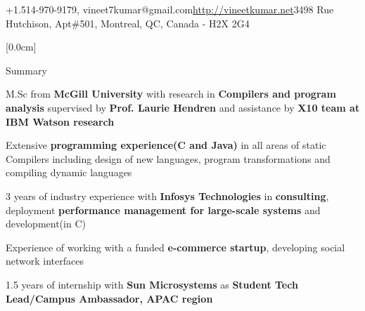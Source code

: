 \documentclass{resume} %
\begin{document}
\begin{hSubsection}{+1.514-970-9179, vineet7kumar@gmail.com}{\url{http://vineetkumar.net}}{3498 Rue Hutchison, Apt\#501, Montreal, QC, Canada - H2X 2G4}
 
\end{hSubsection}


[0.0cm]
\begin{rSection}{Summary}
\smallskip
\begin{lSubsection}
 \item M.Sc from \textbf{McGill University} with research in \textbf{Compilers and program analysis} supervised by \textbf{Prof. Laurie Hendren} and assistance by \textbf{X10 team at IBM Watson research}
 \item Extensive \textbf{programming experience(C and Java)} in all areas of static Compilers including design of new languages, program transformations and compiling dynamic languages
 \item 3 years of industry experience with \textbf{Infosys Technologies} in \textbf{consulting}, deployment \textbf{performance management for large-scale systems} and development(in C)
 \item Experience of working with a funded \textbf{e-commerce startup}, developing social network interfaces
 \item 1.5 years of internship with \textbf{Sun Microsystems} as \textbf{Student Tech Lead/Campus Ambassador, APAC region}
 
\end{lSubsection}
\end{rSection}
\end{document}
